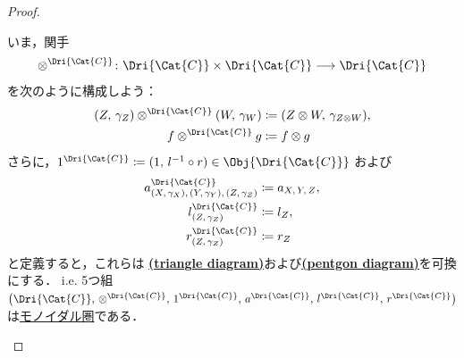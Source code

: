 \documentclass[TQFT_main]{subfiles}
\begin{document}
\begin{proof}
\begin{enumerate}
        いま，関手 
        \begin{align}
            \otimes^{\Dri{\Cat{C}}} \colon \Dri{\Cat{C}} \times \Dri{\Cat{C}} \lto \Dri{\Cat{C}}
        \end{align}
        を次のように構成しよう：
        \begin{align}
            (Z,\, \gamma_Z) \otimes^{\Dri{\Cat{C}}} (W,\, \gamma_W)
            &\coloneqq (Z \otimes W,\, \gamma_{Z \otimes W}), \\
            f \otimes^{\Dri{\Cat{C}}} g &\coloneqq f \otimes g
        \end{align}
        さらに，$1^{\Dri{\Cat{C}}} \coloneqq (1,\, l^{-1} \circ r) \in \Obj{\Dri{\Cat{C}}}$ および
        \begin{align}
            a^{\Dri{\Cat{C}}}_{(X,\, \gamma_X),\, (Y,\, \gamma_Y),\, (Z,\, \gamma_Z)} &\coloneqq a_{X,\, Y,\, Z}, \\
            l^{\Dri{\Cat{C}}}_{(Z,\, \gamma_Z)} &\coloneqq l_{Z}, \\
            r^{\Dri{\Cat{C}}}_{(Z,\, \gamma_Z)} &\coloneqq r_{Z}
        \end{align}
        と定義すると，これらは \hyperref[redef:monoidal-category]{\textsf{\textbf{(triangle diagram)}}}および\hyperref[redef:monoidal-category]{\textsf{\textbf{(pentgon diagram)}}}を可換にする．
        i.e. 5つ組 $\bigl( \Dri{\Cat{C}},\, \otimes^{\Dri{\Cat{C}}},\, 1^{\Dri{\Cat{C}}},\, a^{\Dri{\Cat{C}}},\, l^{\Dri{\Cat{C}}},\, r^{\Dri{\Cat{C}}} \bigr)$ は\hyperref[redef:monoidal-category]{モノイダル圏}である．


\end{enumerate}
\end{proof}
\end{document}
